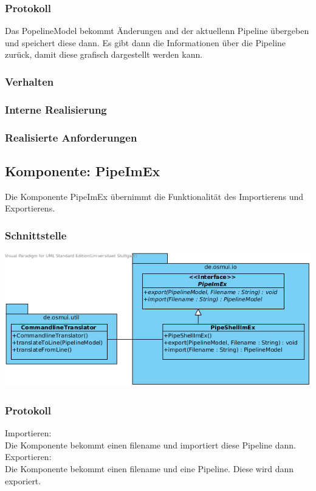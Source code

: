 \documentclass[a4paper,12pt]{scrartcl}
\begin{document}
\subsubsection{Protokoll}
Das PopelineModel bekommt Änderungen and der aktuellenn Pipeline übergeben und speichert diese dann. Es gibt dann die Informationen über die Pipeline zurück, damit diese grafisch dargestellt werden kann.
\subsubsection{Verhalten}
\subsubsection{Interne Realisierung}
\subsubsection{Realisierte Anforderungen}


\subsection{Komponente: PipeImEx}
Die Komponente PipeImEx übernimmt die Funktionalität des Importierens und Exportierens.
\subsubsection{Schnittstelle}
\begin{center}
\includegraphics[width=17cm]{Schnittstelle_PipeImEx.png}
\end{center}
\subsubsection{Protokoll}
Importieren: \\
Die Komponente bekommt einen filename und importiert diese Pipeline dann.\\
Exportieren: \\
Die Komponente bekommt einen filename und eine Pipeline. Diese wird dann exporiert.
\end{document}
